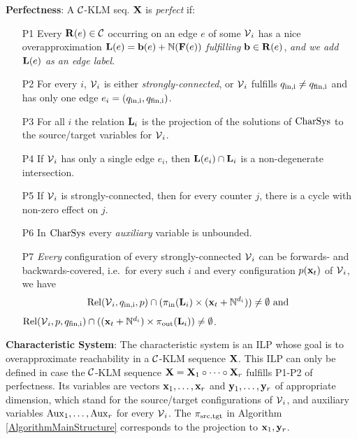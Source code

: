 \begin{definition}\textbf{Perfectness}: A \(\mathcal{C}\)-KLM seq. \(\mathbf{X}\) is \emph{perfect} if:\label{DefinitionPerfectness}%

\begin{enumerate}
\item[P1] Every \(\mathbf{R}(e) \in \mathcal{C}\) occurring on an edge \(e\) of some \(\operatorname{\mathcal{V}}_i\) has a nice overapproximation \(\mathbf{L}(e)=\mathbf{b}(e)+\mathbb{N}(\mathbf{F}(e))\) \emph{fulfilling} \(\mathbf{b} \in \mathbf{R}(e)\), \emph{and we add }\(\mathbf{L}(e)\) \emph{as an edge label}.
\item[P2] For every \(i\), \(\operatorname{\mathcal{V}}_i\) is either \emph{strongly-connected}, or \(\operatorname{\mathcal{V}}_i\) fulfills \(q_{\text{in,i}} \neq q_{\text{fin,i}}\) and has only one edge \(e_i=(q_{\text{in,i}},q_{\text{fin,i}})\).%
\item[P3] For all \(i\) the relation \(\mathbf{L}_i\) is the projection of the solutions of \(\operatorname{CharSys}\) to the source/target variables for \(\operatorname{\mathcal{V}}_i\).
\item[P4] If \(\operatorname{\mathcal{V}}_i\) has only a single edge \(e_i\), then \(\mathbf{L}(e_i) \cap \mathbf{L}_i\) is a non-degenerate intersection.
\item[P5] If \(\operatorname{\mathcal{V}}_i\) is strongly-connected, then for every counter \(j\), there is a cycle with non-zero effect on \(j\).
\item[P6] In \(\operatorname{CharSys}\) every \emph{auxiliary} variable is unbounded.
\item[P7] \emph{Every} configuration of every strongly-connected \(\operatorname{\mathcal{V}}_i\) can be forwards- and  backwards-covered, i.e.\ for every such \(i\) and every configuration \(p(\mathbf{x}_t)\) of \(\operatorname{\mathcal{V}}_i\), we have 
\[\operatorname{Rel}(\operatorname{\mathcal{V}}_i,q_{\text{in,i}}, p) \cap (\pi_{\text{in}}(\mathbf{L}_i) \times (\mathbf{x}_t+\mathbb{N}^{d_i})) \neq \emptyset \text{ and }\] \(\operatorname{Rel}(\operatorname{\mathcal{V}}_i, p, q_{\text{fin,i}}) \cap ((\mathbf{x}_t+\mathbb{N}^{d_i}) \times \pi_{\text{out}}(\mathbf{L}_i)) \neq \emptyset\).
\end{enumerate}
\end{definition}

\textbf{Characteristic System}: The characteristic system is an ILP whose goal is to overapproximate reachability in a \(\mathcal{C}\)-KLM sequence \(\mathbf{X}\). This ILP can only be defined in case the \(\mathcal{C}\)-KLM sequence \(\mathbf{X}=\mathbf{X}_1 \circ \dots \circ \mathbf{X}_r\) fulfills P1-P2 of perfectness. Its variables are vectors \(\mathbf{x}_1, \dots, \mathbf{x}_r\) and \(\mathbf{y}_1, \dots, \mathbf{y}_r\) of appropriate dimension, which stand for the source/target configurations of \(\operatorname{\mathcal{V}}_i\), and auxiliary variables \(\operatorname{Aux}_1, \dots, \operatorname{Aux}_r\) for every \(\operatorname{\mathcal{V}}_i\). The \(\pi_{\operatorname{src}, \operatorname{tgt}}\) in Algorithm \ref{AlgorithmMainStructure} corresponds to the projection to \(\mathbf{x}_1, \mathbf{y}_r\).

